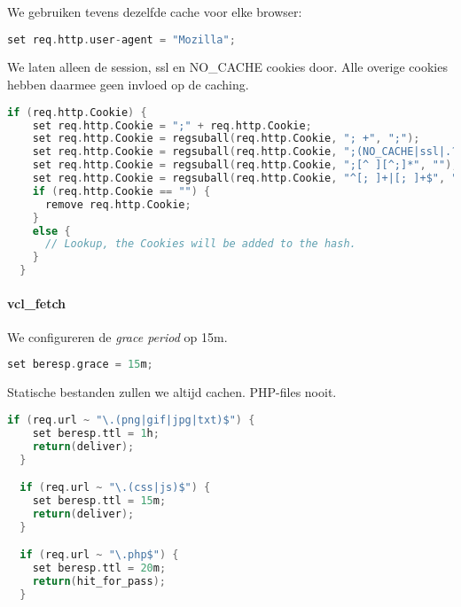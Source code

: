 We gebruiken tevens dezelfde cache voor elke browser:

\begin{lstlisting}[language=C]
  set req.http.user-agent = "Mozilla";
\end{lstlisting}

We laten alleen de session, ssl en NO\_CACHE cookies door. Alle overige cookies hebben daarmee geen invloed op de caching.

\begin{lstlisting}[language=C]
  if (req.http.Cookie) {
    set req.http.Cookie = ";" + req.http.Cookie;
    set req.http.Cookie = regsuball(req.http.Cookie, "; +", ";");
    set req.http.Cookie = regsuball(req.http.Cookie, ";(NO_CACHE|ssl|.?SESS[^=]+)=", "; \1=");
    set req.http.Cookie = regsuball(req.http.Cookie, ";[^ ][^;]*", "");
    set req.http.Cookie = regsuball(req.http.Cookie, "^[; ]+|[; ]+$", "");
    if (req.http.Cookie == "") {
      remove req.http.Cookie;
    }
    else {
      // Lookup, the Cookies will be added to the hash.
    }
  }
\end{lstlisting}

\paragraph{vcl\_fetch}

We configureren de \textit{grace period} op 15m.

\begin{lstlisting}[language=C]
  set beresp.grace = 15m;
\end{lstlisting}

Statische bestanden zullen we altijd cachen. PHP-files nooit.

\begin{lstlisting}[language=C]
  if (req.url ~ "\.(png|gif|jpg|txt)$") {
    set beresp.ttl = 1h;
    return(deliver);
  }

  if (req.url ~ "\.(css|js)$") {
    set beresp.ttl = 15m;
    return(deliver);
  }

  if (req.url ~ "\.php$") {
    set beresp.ttl = 20m;
    return(hit_for_pass);
  }\end{lstlisting}
  